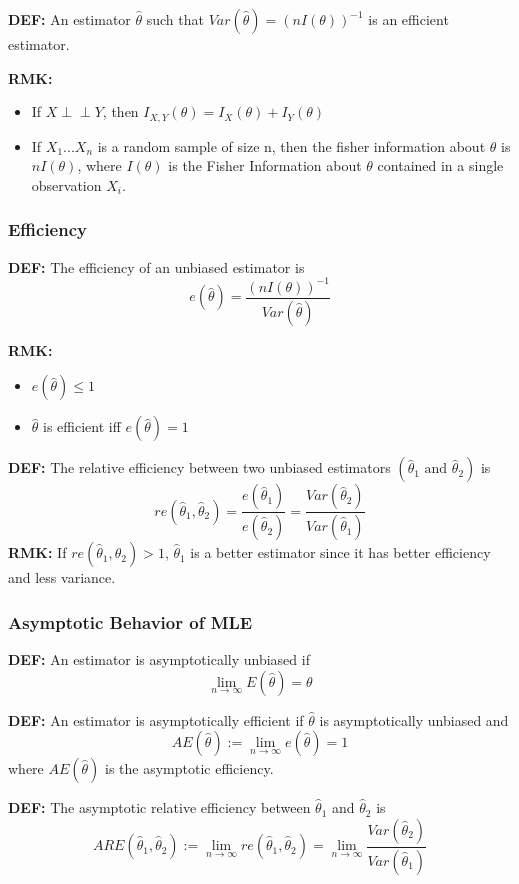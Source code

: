 \documentclass[9pt]{article}
\newcommand{\de}{\textbf{DEF: }}
\newcommand{\rmk}{\textbf{RMK: }}
\newcommand{\indep}{\perp \!\!\! \perp}
\begin{document}
\de An estimator $\hat \theta$ such that $Var(\hat \theta) = (nI(\theta))^{-1}$ is an efficient estimator.

\rmk
\begin{itemize}
    \item If $X \indep Y$, then $I_{X,Y}(\theta) = I_X(\theta) + I_Y(\theta)$
    \item If $X_1...X_n$ is a random sample of size n, then the fisher information about $\theta$ is $nI(\theta)$, where $I(\theta)$ is the Fisher Information about $\theta$ contained in a single observation $X_i$.
\end{itemize}
\subsubsection{Efficiency}

\de The efficiency of an unbiased estimator is 
$$
    e(\hat \theta) = \frac{(nI(\theta))^{-1}}{Var(\hat \theta)}
$$

\rmk
\begin{itemize}
    \item $e(\hat \theta) \le 1$
    \item $\hat \theta$ is efficient iff $e(\hat \theta) = 1$
\end{itemize}

\de The relative efficiency between two unbiased estimators $(\hat \theta_1 \text{ and } \hat \theta_2)$ is 
$$
    re(\hat \theta_1, \hat \theta_2) = \frac{e(\hat \theta_1)}{e(\hat \theta_2)} = \frac{Var(\hat \theta_2)}{Var(\hat \theta_1)}
$$
\rmk If $re(\hat \theta_1, \hat \theta_2) > 1$, $\hat \theta_1$ is a better estimator since it has better efficiency and less variance.

\subsubsection{Asymptotic Behavior of MLE}
\de An estimator is asymptotically unbiased if
$$
\lim_{n \to \infty} E(\hat \theta) = \theta
$$

\de An estimator is asymptotically efficient if $\hat \theta$ is asymptotically unbiased and 
$$
    AE(\hat \theta) := \lim_{n\to \infty} e(\hat \theta) = 1
$$
where $AE(\hat \theta)$ is the asymptotic efficiency.

\de The asymptotic relative efficiency between $\hat \theta_1$ and $\hat \theta_2$ is 
$$
    ARE(\hat \theta_1, \hat \theta_2) := \lim_{n\to \infty} re(\hat \theta_1, \hat \theta_2) = \lim_{n\to \infty}\frac{Var(\hat \theta_2)}{Var(\hat \theta_1)}
$$
\end{document}

